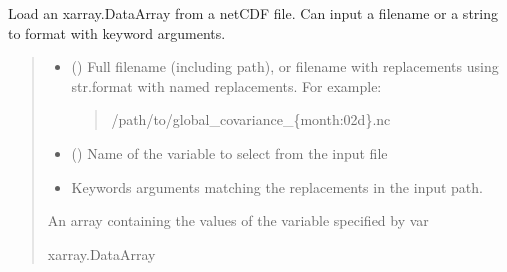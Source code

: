 \documentclass[letterpaper,10pt,english]{sphinxmanual}
\begin{document}
\begin{fulllineitems}
\label{\detokenize{misc:glomar_gridding.io.load_array}}
\pysigstartsignatures
\pysiglinewithargsret
{}
{\sphinxparamcomma {}\sphinxparamcomma {}}
{}
\pysigstopsignatures
\sphinxAtStartPar
Load an xarray.DataArray from a netCDF file. Can input a filename or a
string to format with keyword arguments.
\begin{quote}\begin{description}
\begin{itemize}
\item {}
\sphinxAtStartPar
{} () \textendash{}
\sphinxAtStartPar
Full filename (including path), or filename with replacements using
str.format with named replacements. For example:
\begin{quote}

\sphinxAtStartPar
/path/to/global\_covariance\_\{month:02d\}.nc
\end{quote}


\item {}
\sphinxAtStartPar
{} () \textendash{} Name of the variable to select from the input file

\item {}
\sphinxAtStartPar
{} \textendash{} Keywords arguments matching the replacements in the input path.

\end{itemize}

\sphinxAtStartPar
{} \textendash{} An array containing the values of the variable specified by var

\sphinxAtStartPar
xarray.DataArray

\end{description}\end{quote}

\end{fulllineitems}

\end{document}
